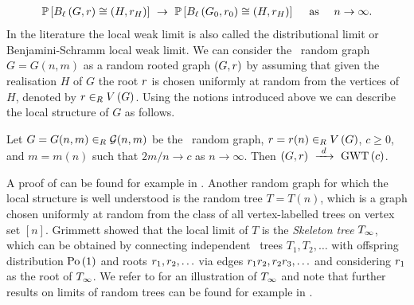 \begin{align*}
\mathbb{P}\left[B_{\ell}\left(G, r\right)\cong\left(H, r_H\right)\right]~\to~ \mathbb{P}\left[B_{\ell}\left(G_0, r_0\right)\cong\left(H, r_H\right)\right] \text{~~~~as~~~~} n\to \infty.
\end{align*}
In the literature the local weak limit is also called the distributional limit or Benjamini-Schramm local weak limit. We can consider the \ER\ random graph $G=G(n,m)$ as a random rooted graph $\left(G, r\right)$ by assuming that given the realisation $H$ of $G$ the root $r$ is chosen uniformly at random from the vertices of $H$, denoted by $r\in_RV\left(G\right)$. Using the notions introduced above we can describe the local structure of $G$ as follows.
\begin{thm}\label{LSthm:local_er}
Let $G=G(n,m)\in_R\mathcal{G}(n,m)$ be the \ER\ random graph, $r=r(n)\in_R V\left(G\right)$, $c\geq 0$, and $m=m(n)$ such that $2m/n\to c$ as $n \to \infty$. Then $\left(G, r\right)~\xrightarrow{~d~}~\operatorname{GWT}\left(c\right)$.
\end{thm}
A proof of  can be found for example in \cite{DemboMontanari2010}. Another random graph for which the local structure is well understood is the random tree $T=T(n)$, which is a graph chosen uniformly at random from the class of all vertex-labelled trees on vertex set $[n]$. Grimmett \cite{Grimmett198081} showed that the local limit of $T$ is the {\em Skeleton tree} $T_\infty$, which can be obtained by connecting independent \GW\ trees $T_1, T_2, \ldots$ with offspring distribution $\operatorname{Po}\left(1\right)$ and roots $r_1, r_2, \ldots$ via edges $r_1r_2, r_2r_3, \ldots$ and considering $r_1$ as the root of $T_\infty$. We refer to  for an illustration of $T_\infty$ and note that further results on limits of random trees can be found for example in \cite{Aldous1991,Devroye1998,Aldous1991b}.

